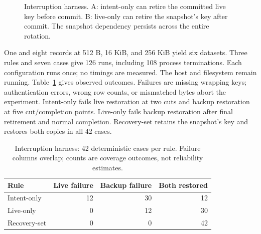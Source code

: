 \documentclass[10pt,conference]{IEEEtran}
\begin{document}
\begin{figure}[t]
\centering
{}
\caption{Interruption harness. A: intent-only can retire the committed live key before commit. B: live-only can retire the snapshot's key after commit. The snapshot dependency persists across the entire rotation.}
\label{fig:lifecycle}
\end{figure}

One and eight records at 512 B, 16 KiB, and 256 KiB yield six datasets. Three rules and seven cases give 126 runs, including 108 process terminations. Each configuration runs once; no timings are measured. The host and filesystem remain running. Table~\ref{tab:crash} gives observed outcomes. Failures are missing wrapping keys; authentication errors, wrong row counts, or mismatched bytes abort the experiment. Intent-only fails live restoration at two cuts and backup restoration at five cut/completion points. Live-only fails backup restoration after final retirement and normal completion. Recovery-set retains the snapshot's key and restores both copies in all 42 cases.

\begin{table}[t]
\caption{Interruption harness: 42 deterministic cases per rule. Failure columns overlap; counts are coverage outcomes, not reliability estimates.}
\label{tab:crash}\centering
\begin{tabular}{@{}lrrr@{}}
\toprule
Rule & Live failure & Backup failure & Both restored\\
\midrule
Intent-only & 12 & 30 & 12\\
Live-only & 0 & 12 & 30\\
Recovery-set & 0 & 0 & 42\\
\bottomrule
\end{tabular}
\end{table}
\end{document}
